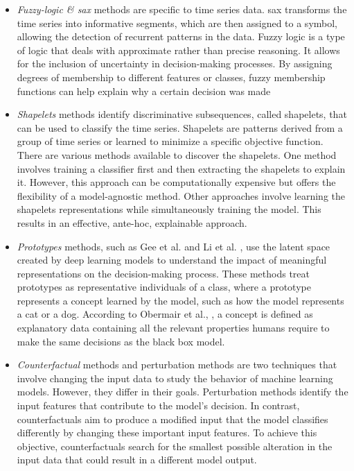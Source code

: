 \begin{itemize}
    \item \textit{Fuzzy-logic \& \gls{sax}} methods \cite{senin_sax-vsm_2013, nguyen_interpretable_2018, el-sappagh_ontology-based_2018, wang_deep_2021} are specific to time series data. \gls{sax} \cite{senin_sax-vsm_2013, nguyen_interpretable_2018} transforms the time series into informative segments, which are then assigned to a symbol, allowing the detection of recurrent patterns in the data. Fuzzy logic \cite{el-sappagh_ontology-based_2018, wang_deep_2021} is a type of logic that deals with approximate rather than precise reasoning. It allows for the inclusion of uncertainty in decision-making processes. By assigning degrees of membership to different features or classes, fuzzy membership functions can help explain why a certain decision was made
    \item \textit{Shapelets} methods \cite{wang_learning_2019, kidger_generalised_2020, li_efficient_2022} identify discriminative subsequences, called shapelets, that can be used to classify the time series. Shapelets are patterns derived from a group of time series or learned to minimize a specific objective function. There are various methods available to discover the shapelets. One method \cite{ye_time_2009} involves training a classifier first and then extracting the shapelets to explain it. However, this approach can be computationally expensive but offers the flexibility of a model-agnostic method. Other approaches \cite{lines_shapelet_2012} involve learning the shapelets representations while simultaneously training the model. This results in an effective, ante-hoc, explainable approach.
    \item \textit{Prototypes} methods, such as Gee et al. \cite{gee_explaining_2019} and Li et al. \cite{li_prototypes_2023}, use the latent space created by deep learning models to understand the impact of meaningful representations on the decision-making process. These methods treat prototypes as representative individuals of a class, where a prototype represents a concept learned by the model, such as how the model represents a cat or a dog. According to Obermair et al., \cite{obermair_example_2023}, a concept is defined as explanatory data containing all the relevant properties humans require to make the same decisions as the black box model.
    \item \textit{Counterfactual} methods \cite{wachter_counterfactual_2018, tonekaboni_explaining_2019, ates_counterfactual_2021, delaney_instance-based_2021, hollig_tsevo_2022} and perturbation methods are two techniques that involve changing the input data to study the behavior of machine learning models. However, they differ in their goals. Perturbation methods identify the input features that contribute to the model's decision. In contrast, counterfactuals aim to produce a modified input that the model classifies differently by changing these important input features. To achieve this objective, counterfactuals search for the smallest possible alteration in the input data that could result in a different model output.
\end{itemize}

